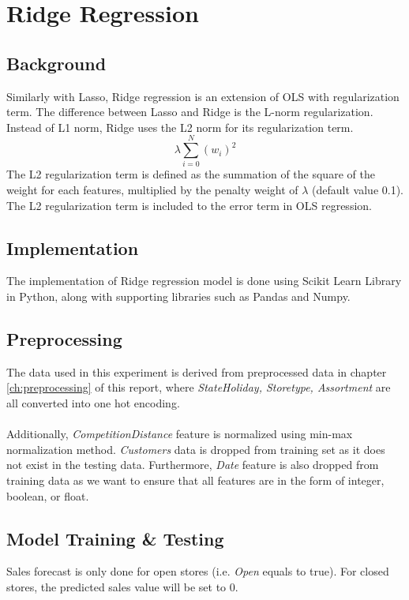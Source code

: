 \section{Ridge Regression} \label{sc:ridge}

\subsection{Background}
Similarly with Lasso, Ridge regression is an extension of OLS with regularization term. The difference between Lasso and Ridge is the L-norm regularization. Instead of L1 norm, Ridge uses the L2 norm for its regularization term.
\begin{equation}
\label{eq:l2_regularization}
\lambda \sum_{i=0}^{N} (w_i)^2
\end{equation}
The L2 regularization term is defined as the summation of the square of the weight for each features, multiplied by the penalty weight of $\lambda$ (default value 0.1). The L2 regularization term is included to the error term in OLS regression.

\subsection{Implementation}
The implementation of Ridge regression model is done using Scikit Learn Library in Python, along with supporting libraries such as Pandas and Numpy.

\subsection{Preprocessing}
The data used in this experiment is derived from preprocessed data in chapter \ref{ch:preprocessing} of this report, where \textit{StateHoliday, Storetype, Assortment} are all converted into one hot encoding. \\ \\
Additionally, \textit{CompetitionDistance} feature is normalized using min-max normalization method. \textit{Customers} data is dropped from training set as it does not exist in the testing data. Furthermore, \textit{Date} feature is also dropped from training data as we want to ensure that all features are in the form of integer, boolean, or float.

\subsection{Model Training \& Testing}
Sales forecast is only done for open stores (i.e. \textit{Open} equals to true). For closed stores, the predicted sales value will be set to 0.

